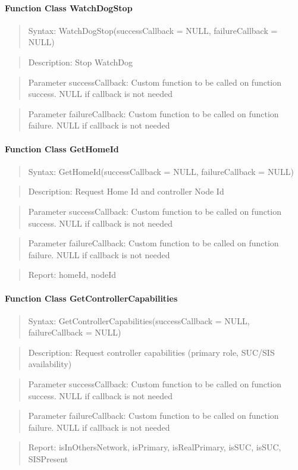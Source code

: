 \paragraph{Function Class WatchDogStop}
\begin{quote}Syntax: WatchDogStop(successCallback = NULL, failureCallback = NULL)\end{quote}
\begin{quote}Description: Stop WatchDog\end{quote}
\begin{quote}Parameter successCallback: Custom function to be called on function success. NULL if callback is not needed\end{quote}
\begin{quote}Parameter failureCallback: Custom function to be called on function failure. NULL if callback is not needed\end{quote}


\paragraph{Function Class GetHomeId}
\begin{quote}Syntax: GetHomeId(successCallback = NULL, failureCallback = NULL)\end{quote}
\begin{quote}Description: Request Home Id and controller Node Id\end{quote}
\begin{quote}Parameter successCallback: Custom function to be called on function success. NULL if callback is not needed\end{quote}
\begin{quote}Parameter failureCallback: Custom function to be called on function failure. NULL if callback is not needed\end{quote}
\begin{quote}Report: homeId, nodeId\end{quote}

\paragraph{Function Class GetControllerCapabilities}
\begin{quote}Syntax: GetControllerCapabilities(successCallback = NULL, failureCallback = NULL)\end{quote}
\begin{quote}Description: Request controller capabilities (primary role, SUC/SIS availability)\end{quote}
\begin{quote}Parameter successCallback: Custom function to be called on function success. NULL if callback is not needed\end{quote}
\begin{quote}Parameter failureCallback: Custom function to be called on function failure. NULL if callback is not needed\end{quote}
\begin{quote}Report: isInOthersNetwork, isPrimary, isRealPrimary, isSUC, isSUC, SISPresent\end{quote}

